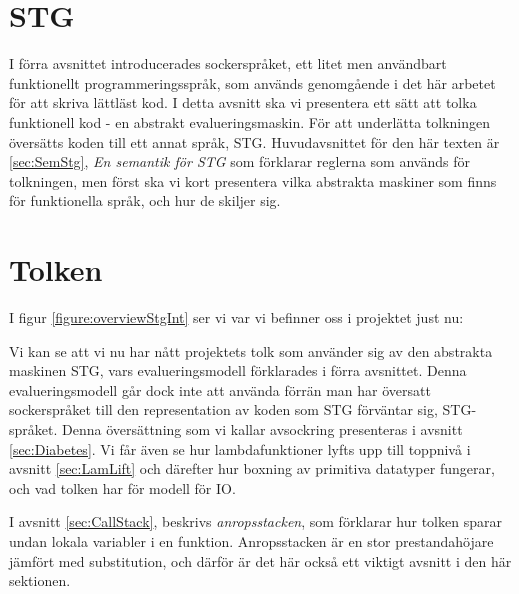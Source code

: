 \documentclass[Rapport]{subfiles}
\begin{document}
\section{STG}
\label{sec:Core}
\label{sec:STG}

\overviewStg

I förra avsnittet introducerades sockerspråket, ett litet men användbart
funktionellt programmeringsspråk, som används genomgående i det här
arbetet för att skriva lättläst kod.
    I detta avsnitt ska vi presentera ett sätt att tolka funktionell kod - 
en abstrakt evalueringsmaskin. För att underlätta
tolkningen översätts koden till ett annat språk, STG. 
Huvudavsnittet för den här texten är \ref{sec:SemStg}, \emph{En semantik för STG}
som förklarar reglerna som används för tolkningen, men först ska vi kort presentera
vilka abstrakta maskiner som finns för funktionella språk, och hur de skiljer sig.






\section{Tolken}
\label{sec:Tolken}

I figur \ref{figure:overviewStgInt} ser vi var vi befinner oss i projektet just nu:

\overviewStgInt

Vi kan se att vi nu har nått projektets tolk som använder sig av den abstrakta maskinen STG, vars
evalueringsmodell förklarades i förra avsnittet. Denna evalueringsmodell går
dock inte att använda förrän man har översatt
sockerspråket till den representation av koden som STG förväntar sig, STG-språket.
Denna översättning som vi kallar avsockring presenteras i avsnitt \ref{sec:Diabetes}.
Vi får även se hur lambdafunktioner lyfts upp till toppnivå i avsnitt \ref{sec:LamLift}
och därefter hur boxning av primitiva datatyper fungerar, och vad tolken har
för modell för IO.

I avsnitt \ref{sec:CallStack}, beskrivs \emph{anropsstacken}, som förklarar hur tolken
sparar undan lokala variabler i en funktion. Anropsstacken är en 
stor prestandahöjare jämfört med substitution, och därför är det här också ett
viktigt avsnitt i den här sektionen.






\end{document}

